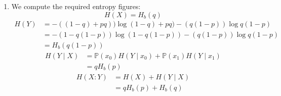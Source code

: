 \documentclass[12pt]{article}%
\begin{document}
\begin{enumerate}
  \item We compute the required entropy figures:
  \begin{equation*}
    H(X) = H_b(q)
  \end{equation*}
  \begin{align*}
    H(Y) & = -((1-q) + pq))\log{(1-q) + pq)} - (q(1-p))\log{q(1-p)} \\
        & = -(1 - q(1-p))\log{(1 - q(1-p))} - (q(1-p))\log{q(1-p)} \\
        & = H_b(q(1-p))
  \end{align*}
  \begin{align*}
    H(Y\mid X) & = \mathbb{P}(x_0)H(Y\mid x_0) + \mathbb{P}(x_1)H(Y\mid x_1) \\
    & = q H_b(p)
  \end{align*}
  \begin{align*}
    H(X:Y) & = H(X) + H(Y\mid X) \\
           & = qH_b(p) + H_b(q)
  \end{align*}


\end{enumerate}
\end{document}
